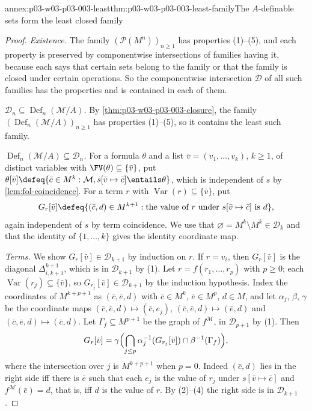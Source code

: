 \begin{annexitem}{annex:p03-w03-p03-003-least}{thm:p03-w03-p03-003-least-family}{The \(A\)-definable sets form the least closed family}
\begin{proof}
\emph{Existence.}  The family \((\mathcal P(M^n))_{n\geq1}\) has
properties (1)--(5), and each property is preserved by componentwise
intersections of families having it, because each says that certain sets
belong to the family or that the family is closed under certain operations.
So the componentwise intersection \(\mathcal D\) of all such families has
the properties and is contained in each of them.

\emph{\(\mathcal D_n\subseteq\operatorname{Def}_n(\mathcal M/A)\).}  By
\cref{thm:p03-w03-p03-003-closure}, the family
\((\operatorname{Def}_n(\mathcal M/A))_{n\geq1}\) has properties (1)--(5),
so it contains the least such family.

\emph{\(\operatorname{Def}_n(\mathcal M/A)\subseteq\mathcal D_n\).}  For a
formula \(\theta\) and a list \(\bar v=(v_1,\ldots,v_k)\), \(k\geq1\), of
distinct variables with \(\FV(\theta)\subseteq\{\bar v\}\), put
\(\theta[\bar v]\defeq\{\bar c\in M^k:\mathcal M,s[\bar v\mapsto\bar c]
\entails\theta\}\), which is independent of \(s\) by
\cref{lem:fol-coincidence}.  For a term \(r\) with
\(\operatorname{Var}(r)\subseteq\{\bar v\}\), put
\[
 G_r[\bar v]\defeq\{(\bar c,d)\in M^{k+1}:
   \text{the value of }r\text{ under }s[\bar v\mapsto\bar c]\text{ is }d\},
\]
again independent of \(s\) by term coincidence.  We use that
\(\varnothing=M^k\setminus M^k\in\mathcal D_k\) and that the identity of
\(\{1,\ldots,k\}\) gives the identity coordinate map.

\emph{Terms.}  We show \(G_r[\bar v]\in\mathcal D_{k+1}\) by induction on
\(r\).  If \(r=v_i\), then \(G_r[\bar v]\) is the diagonal
\(\Delta^{k+1}_{i,k+1}\), which is in \(\mathcal D_{k+1}\) by (1).  Let
\(r=f(r_1,\ldots,r_p)\) with \(p\geq0\); each
\(\operatorname{Var}(r_j)\subseteq\{\bar v\}\), so
\(G_{r_j}[\bar v]\in\mathcal D_{k+1}\) by the induction hypothesis.  Index
the coordinates of \(M^{k+p+1}\) as \((\bar c,\bar e,d)\) with
\(\bar c\in M^k\), \(\bar e\in M^p\), \(d\in M\), and let \(\alpha_j\),
\(\beta\), \(\gamma\) be the coordinate maps
\((\bar c,\bar e,d)\mapsto(\bar c,e_j)\),
\((\bar c,\bar e,d)\mapsto(\bar e,d)\) and
\((\bar c,\bar e,d)\mapsto(\bar c,d)\).  Let \(\Gamma_f\subseteq M^{p+1}\)
be the graph of \(f^{\mathcal M}\), in \(\mathcal D_{p+1}\) by (1).  Then
\[
 G_r[\bar v]=\gamma\Bigl(\bigcap_{j\leq p}\alpha_j^{-1}(G_{r_j}[\bar v])
   \cap\beta^{-1}(\Gamma_f)\Bigr),
\]
where the intersection over \(j\) is \(M^{k+p+1}\) when \(p=0\).  Indeed
\((\bar c,d)\) lies in the right side iff there is \(\bar e\) such that each
\(e_j\) is the value of \(r_j\) under \(s[\bar v\mapsto\bar c]\) and
\(f^{\mathcal M}(\bar e)=d\), that is, iff \(d\) is the value of \(r\).  By
(2)--(4) the right side is in \(\mathcal D_{k+1}\).


\end{proof}
\end{annexitem}
